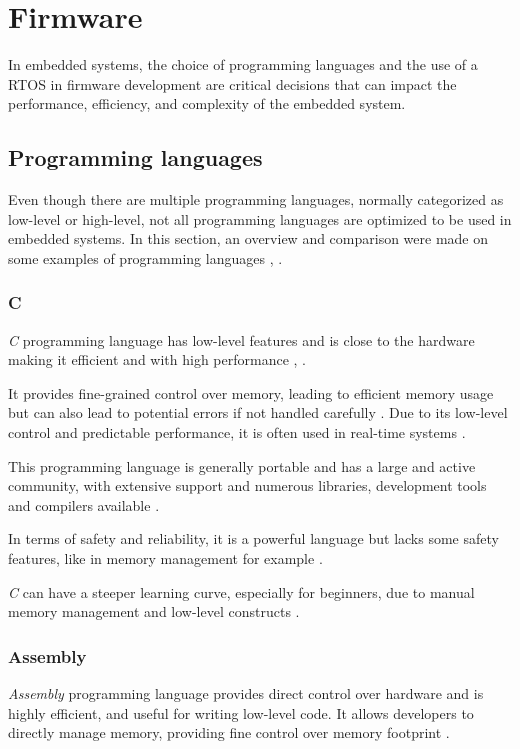 \section{Firmware}
In embedded systems, the choice of programming languages and the use of a \gls{RTOS} in firmware development are critical decisions that can impact the performance, efficiency, and complexity of the embedded system.

\subsection{Programming languages}
Even though there are multiple programming languages, normally categorized as low-level or high-level, not all programming languages are optimized to be used in embedded systems.
In this section, an overview and comparison were made on some examples of programming languages \cite{LPROG4}, \cite{LPROG6}.

\subsubsection{C}
\textit{C} programming language has low-level features and is close to the hardware making it efficient and with high performance \cite{LPROG2}, \cite{LPROG6}.

It provides fine-grained control over memory, leading to efficient memory usage but can also lead to potential errors if not handled carefully \cite{LPROG5}.
Due to its low-level control and predictable performance, it is often used in real-time systems \cite{LPROG7}.

This programming language is generally portable and has a large and active community, with extensive support and numerous libraries, development tools and compilers available \cite{LPROG7}.

In terms of safety and reliability, it is a powerful language but lacks some safety features, like in memory management for example \cite{LPROG7}.

\textit{C} can have a steeper learning curve, especially for beginners, due to manual memory management and low-level constructs \cite{LPROG2}.

\subsubsection{Assembly}
\textit{Assembly} programming language provides direct control over hardware and is highly efficient, and useful for writing low-level code.
It allows developers to directly manage memory, providing fine control over memory footprint \cite{LPROG7}.

